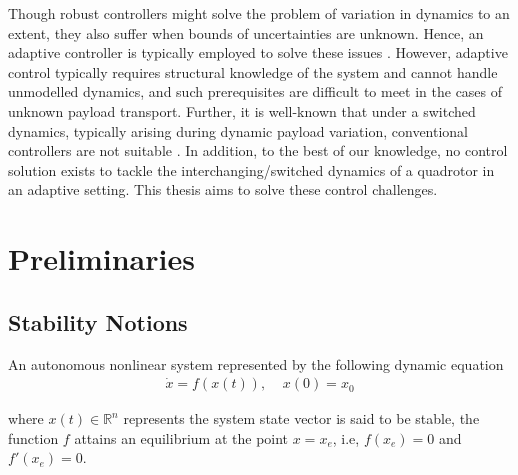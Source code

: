 Though robust controllers \cite{zhao2015nonlinear, nersesov2014estimation, sankaranarayanan2009control, xu2008sliding, Ref:17} might solve the problem of variation in dynamics to an extent, they also suffer when bounds of uncertainties are unknown. Hence, an adaptive controller is typically employed to solve these issues \cite{nicol2011robust, bialy2013lyapunov, dydek2012adaptive, ha2014passivity, tran2018adaptive, tian2019adaptive, zhao2014nonlinear, yang2019energy, roy2019adaptive, roy2020adaptive}. However, adaptive control typically requires structural knowledge of the system and cannot handle unmodelled dynamics, and such prerequisites are difficult to meet in the cases of unknown payload transport. Further, it is well-known that under a switched dynamics, typically arising during dynamic payload variation, conventional controllers are not suitable \cite{lai2018adaptive,yuan2018robust,yuan2017adaptive,lou2018immersion, chen2018global, ye2021robustifying}. In addition, to the best of our knowledge, no control solution exists to tackle the interchanging/switched dynamics of a quadrotor in an adaptive setting. This thesis aims to solve these control challenges.


\section{Preliminaries}
\subsection{Stability Notions}

An autonomous nonlinear system represented by the following dynamic equation
\begin{align*}
{\dot {x}}=f(x(t)),\;\;\;\;x(0)=x_{0}    
\end{align*}

where ${\displaystyle x(t)\in  \mathbb {R}^n}$ represents the system state vector is said to be stable, the function $f$ attains an equilibrium at the point $x = x_e$, i.e, $f(x_e) = 0$ and $ f'(x_e) = 0$.

